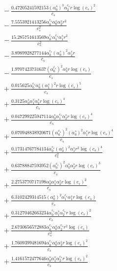 \documentclass[10pt]{article}
\begin{document}
\begin{align*}
&{}  - \frac{0.47205241592153 \left(\alpha_{0}^s\right)^{3} \alpha_{2}^{c_s} r \log{\left(c_{s} \right)}^{2}}{c_{s}} \\
&{}  - \frac{7.5553921413256 \alpha_{0}^{c_s} \alpha_{0}^s \alpha_{2}^s r^{2}}{c_{s}^{2}} \\
&{}  - \frac{15.285751613569 \alpha_{0}^{c_s} \alpha_{1}^{c_s} \alpha_{1}^s r^{2}}{c_{s}^{2}} \\
&{}  - \frac{3.8989928277144 \alpha_{0}^{c_s} \left(\alpha_{0}^s\right)^{2} \alpha_{2}^s r}{c_{s}} \\
&{}  - \frac{1.9707423731637 \left(\alpha_{0}^{c_s}\right)^{2} \alpha_{3}^s r \log{\left(c_{s} \right)}}{c_{s}} \\
&{}  + \frac{0.015625 \alpha_{0}^{c_s} \alpha_{0}^s \left(\alpha_{1}^s\right)^{2} r \log{\left(c_{s} \right)}^{5}}{c_{s}} \\
&{}  + \frac{0.3125 \alpha_{0}^s \alpha_{1}^s \alpha_{2}^s r \log{\left(c_{s} \right)}^{4}}{c_{s}} \\
&{}  + \frac{0.047299225947114 \alpha_{0}^s \alpha_{1}^{c_s} \alpha_{2}^s r \log{\left(c_{s} \right)}^{4}}{c_{s}} \\
&{}  + \frac{0.070948838920671 \left(\alpha_{0}^{c_s}\right)^{2} \left(\alpha_{0}^s\right)^{2} \alpha_{1}^s r \log{\left(c_{s} \right)}^{4}}{c_{s}} \\
&{}  + \frac{0.17314767784134 \alpha_{0}^{c_s} \left(\alpha_{0}^s\right)^{2} \alpha_{1}^s r^{2} \log{\left(c_{s} \right)}^{4}}{c_{s}^{2}} \\
&{}  + \frac{0.63788847593952 \left(\alpha_{0}^{c_s}\right)^{2} \alpha_{0}^s \alpha_{2}^s r \log{\left(c_{s} \right)}^{3}}{c_{s}} \\
&{}  + \frac{2.2753770717198 \alpha_{0}^s \alpha_{1}^s \alpha_{2}^s r \log{\left(c_{s} \right)}^{2}}{c_{s}} \\
&{}  + \frac{6.3102429314515 \left(\alpha_{0}^s\right)^{2} \alpha_{1}^{c_s} \alpha_{1}^s r \log{\left(c_{s} \right)}}{c_{s}} \\
&{}  + \frac{0.31270462663234 \alpha_{0}^{c_s} \alpha_{1}^s \alpha_{2}^{c_s} r \log{\left(c_{s} \right)}^{2}}{c_{s}} \\
&{}  + \frac{2.6730656572883 \alpha_{0}^{c_s} \alpha_{0}^s \alpha_{2}^{c_s} r^{2} \log{\left(c_{s} \right)}}{c_{s}^{2}} \\
&{}  + \frac{1.7609399481694 \alpha_{0}^{c_s} \alpha_{0}^s \alpha_{3}^s r \log{\left(c_{s} \right)}^{2}}{c_{s}} \\
&{}  + \frac{1.4161572477646 \alpha_{0}^s \alpha_{1}^s \alpha_{2}^{c_s} r \log{\left(c_{s} \right)}^{2}}{c_{s}} \\

\end{align*}
\end{document}

